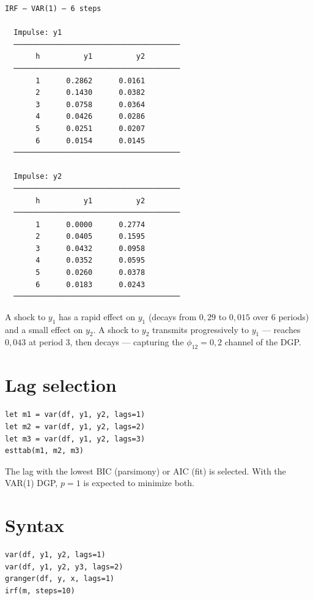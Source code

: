 \begin{lstlisting}[language={}, basicstyle=\ttfamily\small,
  frame=none, numbers=none, backgroundcolor=\color{codbg},
  xleftmargin=0pt, xrightmargin=0pt, breaklines=false]
IRF — VAR(1) — 6 steps

  Impulse: y1
  ──────────────────────────────────────
       h          y1          y2
  ──────────────────────────────────────
       1      0.2862      0.0161
       2      0.1430      0.0382
       3      0.0758      0.0364
       4      0.0426      0.0286
       5      0.0251      0.0207
       6      0.0154      0.0145
  ──────────────────────────────────────

  Impulse: y2
  ──────────────────────────────────────
       h          y1          y2
  ──────────────────────────────────────
       1      0.0000      0.2774
       2      0.0405      0.1595
       3      0.0432      0.0958
       4      0.0352      0.0595
       5      0.0260      0.0378
       6      0.0183      0.0243
  ──────────────────────────────────────
\end{lstlisting}

A shock to $y_1$ has a rapid effect on $y_1$ (decays from $0{,}29$ to
$0{,}015$ over 6 periods) and a small effect on $y_2$. A shock to $y_2$
transmits progressively to $y_1$ --- reaches $0{,}043$ at period 3,
then decays --- capturing the $\phi_{12} = 0{,}2$ channel of the DGP.

\section{Lag selection}

\begin{lstlisting}[caption={Comparison by number of lags}]
let m1 = var(df, y1, y2, lags=1)
let m2 = var(df, y1, y2, lags=2)
let m3 = var(df, y1, y2, lags=3)
esttab(m1, m2, m3)
\end{lstlisting}

The lag with the lowest BIC (parsimony) or AIC (fit) is selected.
With the VAR(1) DGP, $p=1$ is expected to minimize both.

\section{Syntax}

\begin{lstlisting}
var(df, y1, y2, lags=1)
var(df, y1, y2, y3, lags=2)
granger(df, y, x, lags=1)
irf(m, steps=10)
\end{lstlisting}

